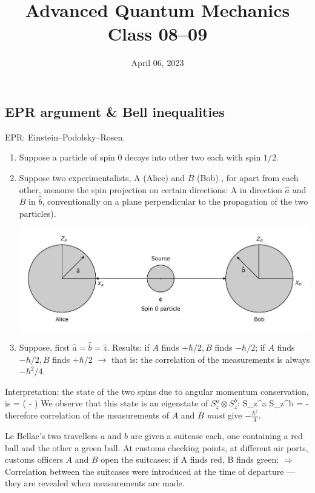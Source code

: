 \documentclass[12pt]{article}
\title{Advanced Quantum Mechanics\\Class 08--09}
\date{April 06, 2023}                                           %
\begin{document}
\maketitle


\subsection{EPR argument \& Bell inequalities}

EPR: Einstein--Podolsky--Rosen.

\begin{enumerate}
\item Suppose a particle of spin 0 decays into other two
each with spin \(1 / 2\).
%
\item Suppose two experimentalists, A (Alice) and \(B\) (Bob) ,
for apart from each other, measure the spin projection
on certain directions: A in direction \(\hat{a}\) and \(B\) in \(\hat{b}\),
conventionally on a plane perpendicular to the
propagation of the two particles).
%
\begin{center}
\includegraphics[width=\textwidth]{Figures/EPR_illustration.pdf}
\end{center}
\item  Suppose, first \(\hat{a}=\hat{b}=\hat{z}\). Results: if \(A\) finds
\(+\hbar / 2, B\) finds \(-\hbar / 2\); if \(A\) finds \(-\hbar / 2, B\) finds \(+\hbar / 2\)
$\rightarrow$
that is: the correlation of the measurements
is always \(-\hbar^{2} / 4\).
\end{enumerate}
Interpretation: the state of the two spins due to
angular momentum conservation, is
\be
\ket{\Phi} = 
\left(\ket{-+} - \ket{+-}\right)
\ee
We observe that this state is an eigenstate of
$S_{z}^{a} \otimes S_{z}^{b}$:
\be
S_{z}^{a} \otimes S_{z}^{b}\ket{\Phi} = - \ket{\Phi}
\ee
therefore correlation  of the measurements of $A$ and $B$
\emph{must} give $-\frac{\hbar^2}{4}$.

Le Bellac's two travellers \(a\) and \(b\) are given a
suitcase each, one containing a red ball and
the other a green ball. At customs checking points,
at different air ports, customs officers \(A\) and \(B\)
open the suitcases: if A finds red, B finds green;
$\Rightarrow$
Correlation between the suitcases were
introduced at the time of departure
--- they are revealed when measurements
are made.
\end{document}
